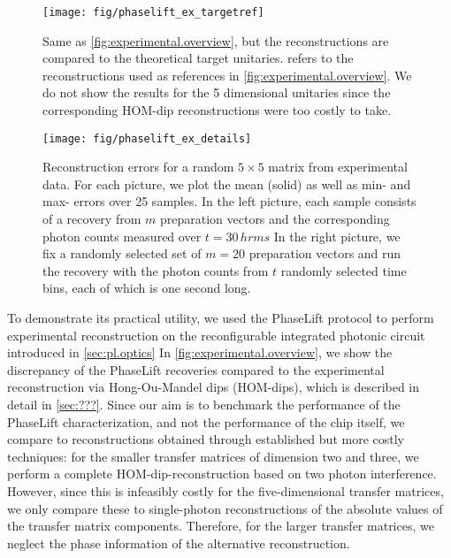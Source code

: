 \begin{figure*}[tbp]
  \centering
  \texttt{[image: fig/phaselift\_ex\_targetref]}
  \caption{%
     \label{fig:experimental.targetref}
     Same as \cref{fig:experimental.overview}, but the reconstructions are compared to the theoretical target unitaries.
      refers to the reconstructions used as references in \cref{fig:experimental.overview}.
     We do not show the results for the 5 dimensional unitaries since the corresponding HOM-dip reconstructions were too costly to take.
  }
\end{figure*}
\begin{figure*}[tbp]
  \centering
  \texttt{[image: fig/phaselift\_ex\_details]}
  \caption{%
    \label{fig:experimental.details}
   Reconstruction errors for a random $5 \times 5$ matrix from experimental data.
   For each picture, we plot the mean (solid) as well as min- and max- errors over 25 samples.
   In the left picture, each sample consists of a recovery from $m$ preparation vectors and the corresponding photon counts measured over $t = 30\,hrm{s}$
   In the right picture, we fix a randomly selected set of $m=20$ preparation vectors and run the recovery with the photon counts from $t$ randomly selected time bins, each of which is one second long.
  }
\end{figure*}

To demonstrate its practical utility, we used the PhaseLift protocol to perform experimental reconstruction on the reconfigurable integrated photonic circuit introduced in \cref{sec:pl.optics}
In \cref{fig:experimental.overview}, we show the discrepancy of the PhaseLift recoveries compared to the experimental reconstruction via Hong-Ou-Mandel dips (HOM-dips), which is described in detail in \cref{sec:???}.
Since our aim is to benchmark the performance of the PhaseLift characterization, and not the performance of the chip itself, we compare to reconstructions obtained through established but more costly techniques: for the smaller transfer matrices of dimension two and three, we perform a complete HOM-dip-reconstruction based on two photon interference.
However, since this is infeasibly costly for the five-dimensional transfer matrices, we only compare these to single-photon reconstructions of the absolute values of the transfer matrix components.
Therefore, for the larger transfer matrices, we neglect the phase information of the alternative reconstruction.

